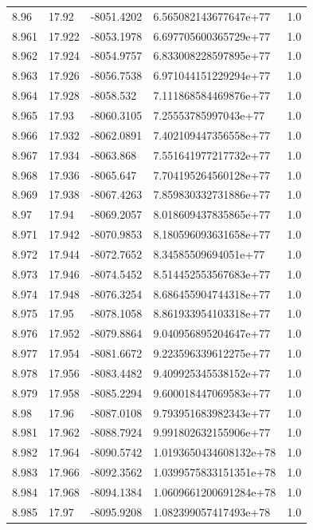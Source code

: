 \begin{tabular}{lllll}
8.96 & 17.92 & -8051.4202 & 6.565082143677647e+77 & 1.0 \\
8.961 & 17.922 & -8053.1978 & 6.697705600365729e+77 & 1.0 \\
8.962 & 17.924 & -8054.9757 & 6.833008228597895e+77 & 1.0 \\
8.963 & 17.926 & -8056.7538 & 6.971044151229294e+77 & 1.0 \\
8.964 & 17.928 & -8058.532 & 7.111868584469876e+77 & 1.0 \\
8.965 & 17.93 & -8060.3105 & 7.25553785997043e+77 & 1.0 \\
8.966 & 17.932 & -8062.0891 & 7.402109447356558e+77 & 1.0 \\
8.967 & 17.934 & -8063.868 & 7.551641977217732e+77 & 1.0 \\
8.968 & 17.936 & -8065.647 & 7.704195264560128e+77 & 1.0 \\
8.969 & 17.938 & -8067.4263 & 7.859830332731886e+77 & 1.0 \\
8.97 & 17.94 & -8069.2057 & 8.018609437835865e+77 & 1.0 \\
8.971 & 17.942 & -8070.9853 & 8.180596093631658e+77 & 1.0 \\
8.972 & 17.944 & -8072.7652 & 8.34585509694051e+77 & 1.0 \\
8.973 & 17.946 & -8074.5452 & 8.514452553567683e+77 & 1.0 \\
8.974 & 17.948 & -8076.3254 & 8.686455904744318e+77 & 1.0 \\
8.975 & 17.95 & -8078.1058 & 8.861933954103318e+77 & 1.0 \\
8.976 & 17.952 & -8079.8864 & 9.040956895204647e+77 & 1.0 \\
8.977 & 17.954 & -8081.6672 & 9.223596339612275e+77 & 1.0 \\
8.978 & 17.956 & -8083.4482 & 9.409925345538152e+77 & 1.0 \\
8.979 & 17.958 & -8085.2294 & 9.600018447069583e+77 & 1.0 \\
8.98 & 17.96 & -8087.0108 & 9.793951683982343e+77 & 1.0 \\
8.981 & 17.962 & -8088.7924 & 9.991802632155906e+77 & 1.0 \\
8.982 & 17.964 & -8090.5742 & 1.0193650434608132e+78 & 1.0 \\
8.983 & 17.966 & -8092.3562 & 1.0399575833151351e+78 & 1.0 \\
8.984 & 17.968 & -8094.1384 & 1.0609661200691284e+78 & 1.0 \\
8.985 & 17.97 & -8095.9208 & 1.082399057417493e+78 & 1.0 \\

\end{tabular}
